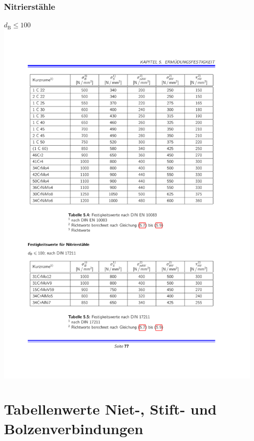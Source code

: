 \begin{multicols}{3}
		\subsection{Nitrierstähle} %
			\label{nitrierstaehle}
			$d_{\text{B}} \leq 100$ \\
			\includegraphics[width=\columnwidth]{graphics/nitrierstaehle}
\chapter{Tabellenwerte Niet-, Stift- und Bolzenverbindungen} %
	\label{flaechenbelastungen}

\end{multicols}

